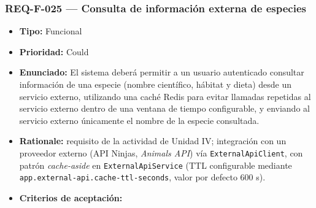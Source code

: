 \documentclass[
  spanish,
]{article}
\providecommand{\tightlist}{%
  \setlength{\itemsep}{0pt}\setlength{\parskip}{0pt}}
\begin{document}
\subsubsection{REQ-F-025 --- Consulta de información externa de
especies}\label{req-f-025-consulta-de-informaciuxf3n-externa-de-especies}

\begin{itemize}
\tightlist
\item
  \textbf{Tipo:} Funcional
\item
  \textbf{Prioridad:} Could
\item
  \textbf{Enunciado:} El sistema deberá permitir a un usuario
  autenticado consultar información de una especie (nombre científico,
  hábitat y dieta) desde un servicio externo, utilizando una caché Redis
  para evitar llamadas repetidas al servicio externo dentro de una
  ventana de tiempo configurable, y enviando al servicio externo
  únicamente el nombre de la especie consultada.
\item
  \textbf{Rationale:} requisito de la actividad de Unidad IV;
  integración con un proveedor externo (API Ninjas, \emph{Animals API})
  vía \texttt{External\allowbreak{}Api\allowbreak{}Client}, con patrón \emph{cache-aside} en
  \texttt{External\allowbreak{}Api\allowbreak{}Service} (TTL configurable mediante
  \texttt{app.\allowbreak{}external-\allowbreak{}api.\allowbreak{}cache-\allowbreak{}ttl-\allowbreak{}seconds}, valor por defecto 600 s).
\item
  \textbf{Criterios de aceptación:}


\end{itemize}
\end{document}
